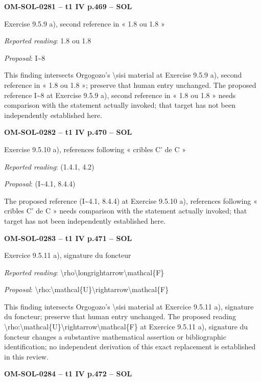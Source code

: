 \par\noindent\textbf{OM-SOL-0281 -- t1 IV p.469 -- SOL}\par
Exercise 9.5.9 a), second reference in « 1.8 ou 1.8 »\par
\emph{Reported reading}: 1.8 ou 1.8\par
\emph{Proposal}: I\textasciitilde{}8\par
This finding intersects Orgogozo's \textbackslash{}sisi material at Exercise 9.5.9 a), second reference in « 1.8 ou 1.8 »; preserve that human entry unchanged. The proposed reference I\textasciitilde{}8 at Exercise 9.5.9 a), second reference in « 1.8 ou 1.8 » needs comparison with the statement actually invoked; that target has not been independently established here.\par
\par\noindent\textbf{OM-SOL-0282 -- t1 IV p.470 -- SOL}\par
Exercise 9.5.10 a), references following « cribles C' de C »\par
\emph{Reported reading}: (1.4.1, 4.2)\par
\emph{Proposal}: (I\textasciitilde{}4.1, 8.4.4)\par
The proposed reference (I\textasciitilde{}4.1, 8.4.4) at Exercise 9.5.10 a), references following « cribles C' de C » needs comparison with the statement actually invoked; that target has not been independently established here.\par
\par\noindent\textbf{OM-SOL-0283 -- t1 IV p.471 -- SOL}\par
Exercice 9.5.11 a), signature du foncteur\par
\emph{Reported reading}: \textbackslash{}rho\textbackslash{}longrightarrow\textbackslash{}mathcal\{F\}\par
\emph{Proposal}: \textbackslash{}rho:\textbackslash{}mathcal\{U\}\textbackslash{}rightarrow\textbackslash{}mathcal\{F\}\par
This finding intersects Orgogozo's \textbackslash{}sisi material at Exercice 9.5.11 a), signature du foncteur; preserve that human entry unchanged. The proposed reading \textbackslash{}rho:\textbackslash{}mathcal\{U\}\textbackslash{}rightarrow\textbackslash{}mathcal\{F\} at Exercice 9.5.11 a), signature du foncteur changes a substantive mathematical assertion or bibliographic identification; no independent derivation of this exact replacement is established in this review.\par
\par\noindent\textbf{OM-SOL-0284 -- t1 IV p.472 -- SOL}\par
